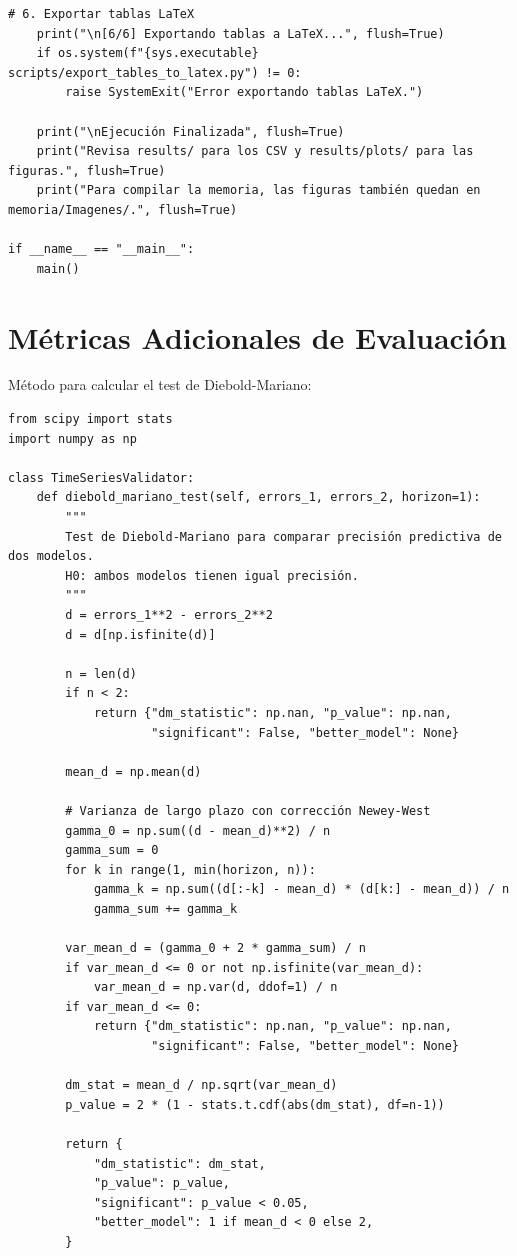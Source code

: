 \begin{lstlisting}[frame=single, caption={Script de ejecucion principal}]
    # 6. Exportar tablas LaTeX
    print("\n[6/6] Exportando tablas a LaTeX...", flush=True)
    if os.system(f"{sys.executable} scripts/export_tables_to_latex.py") != 0:
        raise SystemExit("Error exportando tablas LaTeX.")

    print("\nEjecución Finalizada", flush=True)
    print("Revisa results/ para los CSV y results/plots/ para las figuras.", flush=True)
    print("Para compilar la memoria, las figuras también quedan en memoria/Imagenes/.", flush=True)
    
if __name__ == "__main__":
    main()
\end{lstlisting}

\section{Métricas Adicionales de Evaluación}

Método para calcular el test de Diebold-Mariano:

\begin{lstlisting}[frame=single, caption={Test de Diebold-Mariano}]
from scipy import stats
import numpy as np

class TimeSeriesValidator:
    def diebold_mariano_test(self, errors_1, errors_2, horizon=1):
        """
        Test de Diebold-Mariano para comparar precisión predictiva de dos modelos.
        H0: ambos modelos tienen igual precisión.
        """
        d = errors_1**2 - errors_2**2
        d = d[np.isfinite(d)]

        n = len(d)
        if n < 2:
            return {"dm_statistic": np.nan, "p_value": np.nan,
                    "significant": False, "better_model": None}

        mean_d = np.mean(d)

        # Varianza de largo plazo con corrección Newey-West
        gamma_0 = np.sum((d - mean_d)**2) / n
        gamma_sum = 0
        for k in range(1, min(horizon, n)):
            gamma_k = np.sum((d[:-k] - mean_d) * (d[k:] - mean_d)) / n
            gamma_sum += gamma_k

        var_mean_d = (gamma_0 + 2 * gamma_sum) / n
        if var_mean_d <= 0 or not np.isfinite(var_mean_d):
            var_mean_d = np.var(d, ddof=1) / n
        if var_mean_d <= 0:
            return {"dm_statistic": np.nan, "p_value": np.nan,
                    "significant": False, "better_model": None}

        dm_stat = mean_d / np.sqrt(var_mean_d)
        p_value = 2 * (1 - stats.t.cdf(abs(dm_stat), df=n-1))

        return {
            "dm_statistic": dm_stat,
            "p_value": p_value,
            "significant": p_value < 0.05,
            "better_model": 1 if mean_d < 0 else 2,
        }
\end{lstlisting}

